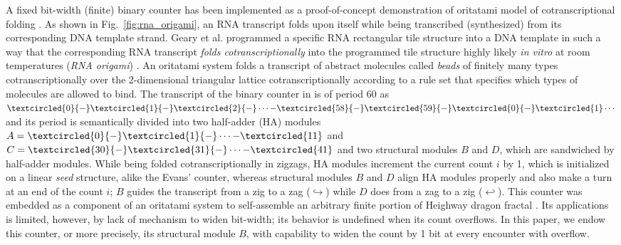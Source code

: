 \documentclass{llncs}
\begin{document}
A fixed bit-width (finite) binary counter has been implemented as a proof-of-concept demonstration of oritatami model of cotranscriptional folding \cite{GeMeScSe2019}. 
As shown in Fig.~\ref{fig:rna_origami}, an RNA transcript folds upon itself while being transcribed (synthesized) from its corresponding DNA template strand. 
Geary et al. programmed a specific RNA rectangular tile structure into a DNA template in such a way that the corresponding RNA transcript \textit{folds cotranscriptionally} into the programmed tile structure highly likely \textit{in vitro} at room temperatures (\textit{RNA origami}) \cite{GearyRothemundAndersen2014}. 
An oritatami system folds a transcript of abstract molecules called \textit{beads} of finitely many types cotranscriptionally over the 2-dimensional triangular lattice cotranscriptionally according to a rule set that specifies which types of molecules are allowed to bind. 
The transcript of the binary counter in \cite{GeMeScSe2019} is of period 60 as $\textcircled{\scriptsize 0}{-}\textcircled{\scriptsize 1}{-}\textcircled{\scriptsize 2}{-} \cdots {-}\textcircled{\scriptsize 58}{-}\textcircled{\scriptsize 59}{-}\textcircled{\scriptsize 0}{-}\textcircled{\scriptsize 1} \cdots$ and its period is semantically divided into two half-adder (HA) modules $A = \textcircled{\scriptsize 0}{-}\textcircled{\scriptsize 1}{-} \cdots {-}\textcircled{\scriptsize 11}$ and $C = \textcircled{\scriptsize 30}{-}\textcircled{\scriptsize 31}{-} \cdots {-}\textcircled{\scriptsize 41}$ and two structural modules $B$ and $D$, which are sandwiched by half-adder modules.
While being folded cotranscriptionally in zigzags, HA modules increment the current count $i$ by 1, which is initialized on a linear \textit{seed} structure, alike the Evans' counter, whereas structural modules $B$ and $D$ align HA modules properly and also make a turn at an end of the count $i$; $B$ guides the transcript from a zig to a zag ($\hookrightarrow$) while $D$ does from a zag to a zig ($\hookleftarrow$). 
This counter was embedded as a component of an oritatami system to self-assemble an arbitrary finite portion of Heighway dragon fractal \cite{MasudaSekiUbukata2018}. 
Its applications is limited, however, by lack of mechanism to widen bit-width; its behavior is undefined when its count overflows. 
In this paper, we endow this counter, or more precisely, its structural module $B$, with capability to widen the count by 1 bit at every encounter with overflow. 
\end{document}
